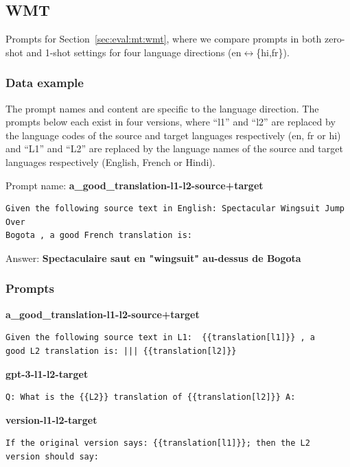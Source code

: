 \documentclass[twoside,11pt]{article}
\begin{document}
\subsection{WMT}

Prompts for Section~\ref{sec:eval:mt:wmt}, where we compare prompts in both zero-shot and 1-shot settings for four language directions (en$\leftrightarrow$\{hi,fr\}).

\subsubsection{Data example}

The prompt names and content are specific to the language direction. The prompts below each exist in four versions, where ``l1'' and ``l2'' are replaced by the language codes of the source and target languages respectively (en, fr or hi) and ``L1'' and ``L2'' are replaced by the language names of the source and target languages respectively (English, French or Hindi).

Prompt name: \textbf{a\_good\_translation-l1-l2-source+target}
\begin{verbatim}
Given the following source text in English: Spectacular Wingsuit Jump Over 
Bogota , a good French translation is:
\end{verbatim}
Answer: \textbf{Spectaculaire saut en "wingsuit" au-dessus de Bogota}

\subsubsection{Prompts}

\textbf{a\_good\_translation-l1-l2-source+target}
\begin{verbatim}
Given the following source text in L1:  {{translation[l1]}} , a 
good L2 translation is: ||| {{translation[l2]}}
\end{verbatim}

\noindent\textbf{gpt-3-l1-l2-target}
\begin{verbatim}
Q: What is the {{L2}} translation of {{translation[l2]}} A:
\end{verbatim}

\noindent\textbf{version-l1-l2-target}
\begin{verbatim}
If the original version says: {{translation[l1]}}; then the L2 
version should say:
\end{verbatim}
\end{document}
